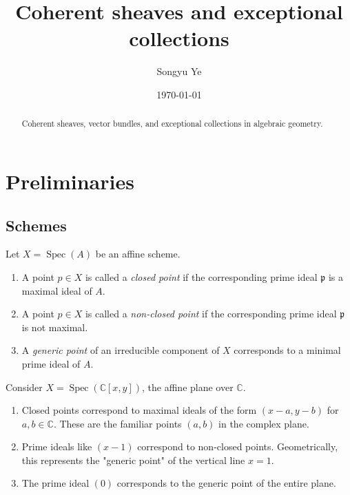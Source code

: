 \documentclass[12pt]{article}
\begin{document}
\rhead{\today}
\cfoot{\thepage}

\title{Coherent sheaves and exceptional collections}

\author{Songyu Ye}
\date{\today}
\maketitle

\begin{abstract}
    Coherent sheaves, vector bundles, and exceptional collections in algebraic geometry.
\end{abstract}

\tableofcontents



\section{Preliminaries}
\subsection{Schemes}
\begin{definition}
    Let $X = \operatorname{Spec}(A)$ be an affine scheme.
    \begin{enumerate}
        \item A point $p \in X$ is called a \textit{closed point} if the corresponding prime ideal $\mathfrak{p}$ is a maximal ideal of $A$.
        \item A point $p \in X$ is called a \textit{non-closed point} if the corresponding prime ideal $\mathfrak{p}$ is not maximal.
        \item A \textit{generic point} of an irreducible component of $X$ corresponds to a minimal prime ideal of $A$.
    \end{enumerate}
\end{definition}

\begin{example}
    Consider $X = \operatorname{Spec}(\mathbb{C}[x,y])$, the affine plane over $\mathbb{C}$.
    \begin{enumerate}
        \item Closed points correspond to maximal ideals of the form $(x-a, y-b)$ for $a, b \in \mathbb{C}$. These are the familiar points $(a,b)$ in the complex plane.
        \item Prime ideals like $(x-1)$ correspond to non-closed points. Geometrically, this represents the "generic point" of the vertical line $x=1$.
        \item The prime ideal $(0)$ corresponds to the generic point of the entire plane.
    \end{enumerate}
\end{example}
\end{document}
